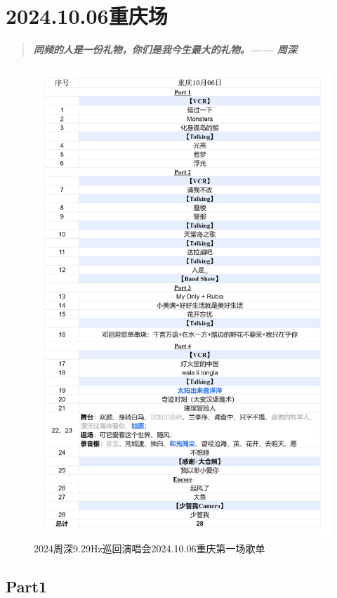 \documentclass[]{ctexbook}
\begin{document}
\chapter{2024.10.06重庆场}\label{chongqing-20241006}

\begin{quote}
\textbf{\emph{同频的人是一份礼物，你们是我今生最大的礼物。------ 周深}}
\end{quote}

\begin{figure}

{\centering \includegraphics[width=320pt]{img/playlists/playlists-chongqing-20241006} 

}

\caption{2024周深9.29Hz巡回演唱会2024.10.06重庆第一场歌单}\label{fig:unnamed-chunk-103}
\end{figure}

\newpage

\section{Part1}\label{chongqing-20241006-part1}
\end{document}
